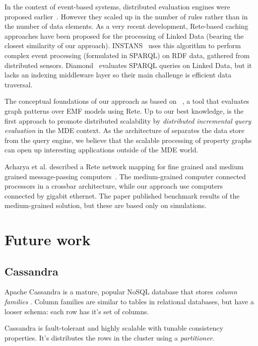 In the context of event-based systems, distributed evaluation engines were proposed earlier~\cite{message-passing-rete}. However they scaled up in the number of rules \cite{mapreduce-rete} rather than in the number of data elements. As a very recent development, Rete-based caching approaches have been proposed for the processing of Linked Data (bearing the closest similarity of our approach). INSTANS~\cite{INSTANS2012} uses this algorithm to perform complex event processing (formulated in SPARQL) on RDF data, gathered from distributed sensors. Diamond~\cite{miranker2012diamond} evaluates SPARQL queries on Linked Data, but it lacks an indexing middleware layer so their main challenge is efficient data traversal.

The conceptual foundations of our approach as based on \eiq{}~\cite{models10}, a tool that evaluates graph patterns over EMF models using Rete. Up to our best knowledge, \iqd{} is the first approach to promote distributed scalability by \emph{distributed incremental query evaluation} in the MDE context. As the architecture of \iqd{} separates the data store from the query engine, we believe that the scalable processing of property graphs can open up interesting applications outside of the MDE world.


Acharya et al. described a Rete network mapping for fine grained and medium grained message-passing computers~\cite{message-passing-rete}. The medium-grained computer connected processors in a crossbar architecture, while our approach use computers connected by gigabit ethernet. The paper published benchmark results of the medium-grained solution, but these are based only on simulations.

\section{Future work}

\subsection{Cassandra}

Apache Cassandra is a mature, popular NoSQL database that stores \textit{column families} \cite{Cassandra}. Column families are similar to tables in relational databases, but have a looser schema: each row has it's set of columns.

Cassandra is fault-tolerant and highly scalable with tunable consistency properties. It's distributes the rows in the cluster using a \textit{partitioner}.


